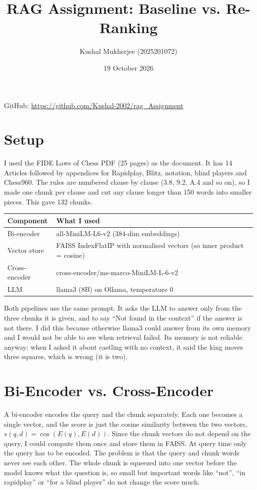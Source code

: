 \documentclass[11pt,a4paper]{article}
\title{RAG Assignment: Baseline vs. Re-Ranking}
\author{Kushal Mukherjee (2025201072)}
\date{19 October 2026}
\begin{document}
\maketitle

\noindent GitHub: \url{https://github.com/Kushal-2002/rag_Assignment}

\section{Setup}

I used the FIDE Laws of Chess PDF (25 pages) as the document. It has 14 Articles followed by appendices for Rapidplay, Blitz, notation, blind players and Chess960. The rules are numbered clause by clause (3.8, 9.2, A.4 and so on), so I made one chunk per clause and cut any clause longer than 150 words into smaller pieces. This gave 132 chunks.

\begin{center}
\begin{tabular}{@{}ll@{}}
\toprule
Component & What I used \\
\midrule
Bi-encoder     & all-MiniLM-L6-v2 (384-dim embeddings) \\
Vector store   & FAISS IndexFlatIP with normalised vectors (so inner product = cosine) \\
Cross-encoder  & cross-encoder/ms-marco-MiniLM-L-6-v2 \\
LLM            & llama3 (8B) on Ollama, temperature 0 \\
\bottomrule
\end{tabular}
\end{center}

Both pipelines use the same prompt. It asks the LLM to answer only from the three chunks it is given, and to say ``Not found in the context'' if the answer is not there. I did this because otherwise llama3 could answer from its own memory and I would not be able to see when retrieval failed. Its memory is not reliable anyway: when I asked it about castling with no context, it said the king moves three squares, which is wrong (it is two).

\section{Bi-Encoder vs. Cross-Encoder}

A bi-encoder encodes the query and the chunk separately. Each one becomes a single vector, and the score is just the cosine similarity between the two vectors, $s(q,d) = \cos(E(q), E(d))$. Since the chunk vectors do not depend on the query, I could compute them once and store them in FAISS. At query time only the query has to be encoded. The problem is that the query and chunk words never see each other. The whole chunk is squeezed into one vector before the model knows what the question is, so small but important words like ``not'', ``in rapidplay'' or ``for a blind player'' do not change the score much.
\end{document}
